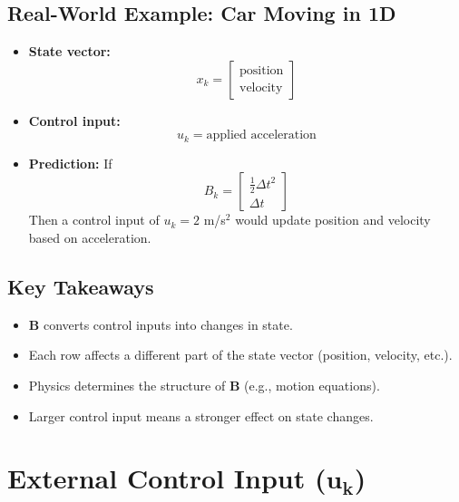 \documentclass{article}
\begin{document}
\subsection*{Real-World Example: Car Moving in 1D}
\begin{itemize}
    \item \textbf{State vector:}  
    \[
    x_k =
    \begin{bmatrix}
    \text{position} \\
    \text{velocity}
    \end{bmatrix}
    \]
    \item \textbf{Control input:}  
    \[
    u_k = \text{applied acceleration}
    \]
    \item \textbf{Prediction:}  
    If 
    \[
    B_k =
    \begin{bmatrix}
    \frac{1}{2} \Delta t^2 \\
    \Delta t
    \end{bmatrix}
    \]
    Then a control input of \( u_k = 2 \) m/s\(^2\) would update position and velocity based on acceleration.
\end{itemize}

\subsection*{Key Takeaways}
\begin{itemize}
    \item {} \(\mathbf{B}\) converts control inputs into changes in state.
    \item {} Each row affects a different part of the state vector (position, velocity, etc.).
    \item {} Physics determines the structure of \(\mathbf{B}\) (e.g., motion equations).
    \item {} Larger control input means a stronger effect on state changes.
\end{itemize}

\newpage

\section*{External Control Input (\(\mathbf{u_k}\))}
\end{document}
